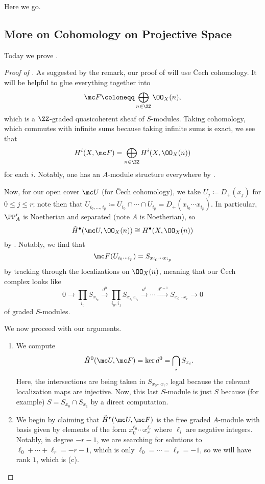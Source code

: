\documentclass[../notes.tex]{subfiles}
\begin{document}
Here we go.

\subsection{More on Cohomology on Projective Space}
Today we prove .
\begin{proof}[Proof of ]
	As suggested by the remark, our proof of  will use \v Cech cohomology. It will be helpful to glue everything together into
	\[\mc F\coloneqq\bigoplus_{n\in\ZZ}\OO_X(n),\]
	which is a $\ZZ$-graded quasicoherent sheaf of $S$-modules. Taking cohomology, which commutes with infinite sums because taking infinite sums is exact, we see that
	\[H^i(X,\mc F)=\bigoplus_{n\in\ZZ}H^i(X,\OO_X(n))\]
	for each $i$. Notably, one has an $A$-module structure everywhere by .

	Now, for our open cover $\mc U$ (for \v Cech cohomology), we take $U_j\coloneqq D_+(x_j)$ for $0\le j\le r$; note then that $U_{i_0,\ldots,i_p}\coloneqq U_{i_0}\cap\cdots\cap U_{i_p}=D_+(x_{i_0}\cdots x_{i_p})$. In particular, $\PP^r_A$ is Noetherian and separated (note $A$ is Noetherian), so
	\[\check H^\bullet(\mc U,\OO_X(n))\cong H^\bullet(X,\OO_X(n))\]
	by . Notably, we find that
	\[\mc F(U_{i_0\cdots i_p})=S_{x_{i_0}\cdots x_{i_p}}\]
	by tracking through the localizations on $\OO_X(n)$, meaning that our \v Cech complex looks like
	\[0\to\prod_{i_0}S_{x_{i_0}}\stackrel{d^0}\to\prod_{i_0,i_1}S_{x_{i_0}x_{i_1}}\stackrel{d^1}\to\cdots\stackrel{d^{r-1}}\to S_{x_0\cdots x_r}\to0\]
	of graded $S$-modules.

	We now proceed with our arguments.
	\begin{enumerate}[label=(\alph*)]
		\item We compute
		\[\check H^0(\mc U,\mc F)=\ker d^0=\bigcap_iS_{x_i}.\]
		Here, the intersections are being taken in $S_{x_0\cdots x_r}$, legal because the relevant localization maps are injective. Now, this last $S$-module is just $S$ because (for example) $S=S_{x_0}\cap S_{x_1}$ by a direct computation.

		\setcounter{enumi}{2}
		\item We begin by claiming that $\check H^r(\mc U,\mc F)$ is the free graded $A$-module with basis given by elements of the form $x_0^{\ell_0}\cdots x_r^{\ell_r}$ where $\ell_i$ are negative integers. Notably, in degree $-r-1$, we are searching for solutions to $\ell_0+\cdots+\ell_r=-r-1$, which is only $\ell_0=\cdots=\ell_r=-1$, so we will have rank $1$, which is (c).


\end{enumerate}
\end{proof}
\end{document}
